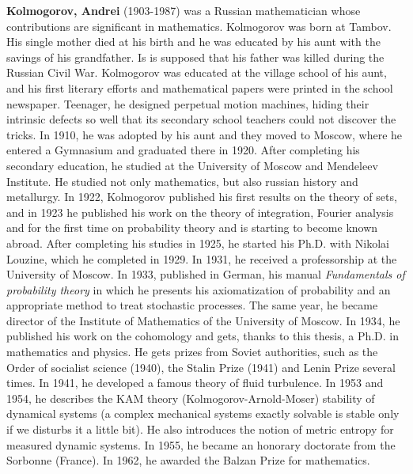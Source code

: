 \textbf{Kolmogorov, Andrei} (1903-1987) was a Russian mathematician whose contributions are significant in mathematics. Kolmogorov was born at Tambov. His single mother died at his birth and he was educated by his aunt with the savings of his grandfather. Is is supposed that his father was killed during the Russian Civil War. Kolmogorov was educated at the village school of his aunt, and his first literary efforts and mathematical papers were printed in the school newspaper. Teenager, he designed perpetual motion machines, hiding their intrinsic defects so well that its secondary school teachers could not discover the tricks. In 1910, he was adopted by his aunt and they moved to Moscow, where he entered a Gymnasium and graduated there in 1920. After completing his secondary education, he studied at the University of Moscow and Mendeleev Institute. He studied not only mathematics, but also russian history and metallurgy. In 1922, Kolmogorov published his first results on the theory of sets, and in 1923 he published his work on the theory of integration, Fourier analysis and for the first time on probability theory and is starting to become known abroad. After completing his studies in 1925, he started his Ph.D. with Nikolai Louzine, which he completed in 1929. In 1931, he received a professorship at the University of Moscow. In 1933, published in German, his manual \textit{Fundamentals of probability theory} in which he presents his axiomatization of probability and an appropriate method to treat stochastic processes. The same year, he became director of the Institute of Mathematics of the University of Moscow. In 1934, he published his work on the cohomology and gets, thanks to this thesis, a Ph.D. in mathematics and physics. He gets prizes from Soviet authorities, such as the Order of socialist science (1940), the Stalin Prize (1941) and Lenin Prize several times. In 1941, he developed a famous theory of fluid turbulence. In 1953 and 1954, he describes the KAM theory (Kolmogorov-Arnold-Moser) stability of dynamical systems (a complex mechanical systems exactly solvable is stable only if we disturbs it a little bit). He also introduces the notion of metric entropy for measured dynamic systems. In 1955, he became an honorary doctorate from the Sorbonne (France). In 1962, he awarded the Balzan Prize for mathematics.

